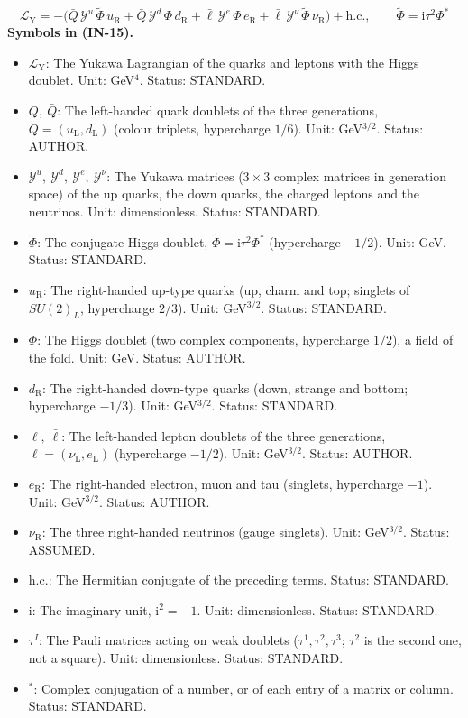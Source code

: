 \documentclass[
  10pt,
]{article}
\providecommand{\tightlist}{%
  \setlength{\itemsep}{0pt}\setlength{\parskip}{0pt}}
\begin{document}
\[
\mathcal{L}_{\mathrm{Y}} = -\big(\bar Q\,\mathcal{Y}^{u}\,\tilde\Phi\,u_{\mathrm{R}} + \bar Q\,\mathcal{Y}^{d}\,\Phi\,d_{\mathrm{R}}
 + \bar\ell\,\mathcal{Y}^{e}\,\Phi\,e_{\mathrm{R}} + \bar\ell\,\mathcal{Y}^{\nu}\,\tilde\Phi\,\nu_{\mathrm{R}}\big)
 + \mathrm{h.c.},\qquad \tilde\Phi = \mathrm{i}\tau^2\Phi^* \tag{IN-15}
\] \textbf{Symbols in (IN-15).}

\begin{itemize}
\tightlist
\item
  \(\mathcal{L}_{\mathrm{Y}}\): The Yukawa Lagrangian of the quarks and
  leptons with the Higgs doublet. Unit: GeV\(^4\). Status: STANDARD.
\item
  \(Q,\ \bar Q\): The left-handed quark doublets of the three
  generations, \(Q = (u_{\mathrm{L}}, d_{\mathrm{L}})\) (colour
  triplets, hypercharge \(1/6\)). Unit: GeV\(^{3/2}\). Status: AUTHOR.
\item
  \(\mathcal{Y}^{u},\ \mathcal{Y}^{d},\ \mathcal{Y}^{e},\ \mathcal{Y}^{\nu}\):
  The Yukawa matrices (\(3 \times 3\) complex matrices in generation
  space) of the up quarks, the down quarks, the charged leptons and the
  neutrinos. Unit: dimensionless. Status: STANDARD.
\item
  \(\tilde\Phi\): The conjugate Higgs doublet,
  \(\tilde\Phi = \mathrm{i}\tau^2\Phi^*\) (hypercharge \(-1/2\)). Unit:
  GeV. Status: STANDARD.
\item
  \(u_{\mathrm{R}}\): The right-handed up-type quarks (up, charm and
  top; singlets of \(SU(2)_L\), hypercharge \(2/3\)). Unit:
  GeV\(^{3/2}\). Status: STANDARD.
\item
  \(\Phi\): The Higgs doublet (two complex components, hypercharge
  \(1/2\)), a field of the fold. Unit: GeV. Status: AUTHOR.
\item
  \(d_{\mathrm{R}}\): The right-handed down-type quarks (down, strange
  and bottom; hypercharge \(-1/3\)). Unit: GeV\(^{3/2}\). Status:
  STANDARD.
\item
  \(\ell,\ \bar\ell\): The left-handed lepton doublets of the three
  generations, \(\ell = (\nu_{\mathrm{L}}, e_{\mathrm{L}})\)
  (hypercharge \(-1/2\)). Unit: GeV\(^{3/2}\). Status: AUTHOR.
\item
  \(e_{\mathrm{R}}\): The right-handed electron, muon and tau (singlets,
  hypercharge \(-1\)). Unit: GeV\(^{3/2}\). Status: AUTHOR.
\item
  \(\nu_{\mathrm{R}}\): The three right-handed neutrinos (gauge
  singlets). Unit: GeV\(^{3/2}\). Status: ASSUMED.
\item
  \(\mathrm{h.c.}\): The Hermitian conjugate of the preceding terms.
  Status: STANDARD.
\item
  \(\mathrm{i}\): The imaginary unit, \(\mathrm{i}^2 = -1\). Unit:
  dimensionless. Status: STANDARD.
\item
  \(\tau^I\): The Pauli matrices acting on weak doublets
  (\(\tau^1, \tau^2, \tau^3\); \(\tau^2\) is the second one, not a
  square). Unit: dimensionless. Status: STANDARD.
\item
  \({}^*\): Complex conjugation of a number, or of each entry of a
  matrix or column. Status: STANDARD.
\end{itemize}
\end{document}
